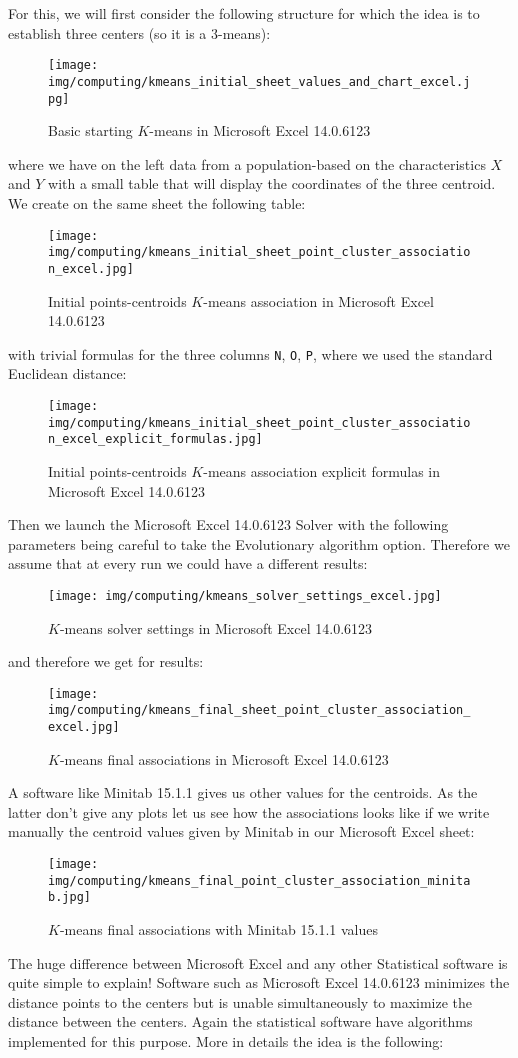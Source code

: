 	For this, we will first consider the following structure for which the idea is to establish three centers (so it is a $3$-means):
	\begin{figure}[H]
		\centering
		\texttt{[image: img/computing/kmeans\_initial\_sheet\_values\_and\_chart\_excel.jpg]}
		\caption[]{Basic starting $K$-means in Microsoft Excel 14.0.6123}
	\end{figure}
	where we have on the left data from a population-based on the characteristics $X$ and $Y$ with a small table that will display the coordinates of the three centroid. We create on the same sheet the following table:
	\begin{figure}[H]
		\centering
		\texttt{[image: img/computing/kmeans\_initial\_sheet\_point\_cluster\_association\_excel.jpg]}
		\caption[]{Initial points-centroids $K$-means association in Microsoft Excel 14.0.6123}
	\end{figure}
	with trivial formulas for the three columns \texttt{N}, \texttt{O}, \texttt{P}, where we used the standard Euclidean distance:
	\begin{figure}[H]
		\centering
		\texttt{[image: img/computing/kmeans\_initial\_sheet\_point\_cluster\_association\_excel\_explicit\_formulas.jpg]}
		\caption[]{Initial points-centroids $K$-means association explicit formulas in Microsoft Excel 14.0.6123}
	\end{figure}
	Then we launch the Microsoft Excel 14.0.6123 Solver  with the following parameters being careful to take the Evolutionary algorithm option. Therefore we assume that at every run we could have a different results:
	\begin{figure}[H]
		\centering
		\texttt{[image: img/computing/kmeans\_solver\_settings\_excel.jpg]}
		\caption[]{$K$-means solver settings in Microsoft Excel 14.0.6123}
	\end{figure}
	and therefore we get for results:
	\begin{figure}[H]
		\centering
		\texttt{[image: img/computing/kmeans\_final\_sheet\_point\_cluster\_association\_excel.jpg]}
		\caption[]{$K$-means final associations in Microsoft Excel 14.0.6123}
	\end{figure}
	A software like Minitab 15.1.1 gives us other values for the centroids. As the latter don't give any plots let us see how the associations looks like if we write manually the centroid values given by Minitab in our Microsoft Excel sheet:
	\begin{figure}[H]
		\centering
		\texttt{[image: img/computing/kmeans\_final\_point\_cluster\_association\_minitab.jpg]}
		\caption[]{$K$-means final associations with Minitab 15.1.1 values}
	\end{figure}
	The huge difference between Microsoft Excel and any other Statistical software is quite simple to explain! Software such as Microsoft Excel 14.0.6123 minimizes the distance points to the centers but is unable simultaneously to maximize the distance between the centers. Again the statistical software have algorithms implemented for this purpose. More in details the idea is the following:
	
